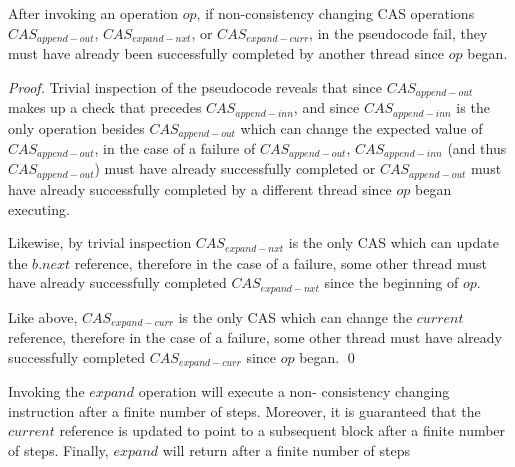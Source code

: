 \documentclass[runningheads,a4paper]{llncs}
\begin{document}

\begin{lemma}\label{lemma-non-consistency-cas} After invoking an operation
$op$, if non-consistency changing CAS operations $CAS_{append-out}$, 
$CAS_{expand-nxt}$, or $CAS_{expand-curr}$, in the pseudocode fail, they must have
already been successfully completed by another thread since $op$ began.
\end{lemma}

\begin{proof} Trivial inspection of the pseudocode reveals that since $CAS_{append-out}$ 
makes up a check that precedes $CAS_{append-inn}$, and since
$CAS_{append-inn}$ is the only operation besides $CAS_{append-out}$ which can
change the expected value of $CAS_{append-out}$, in the case of a failure of
$CAS_{append-out}$, $CAS_{append-inn}$ (and thus $CAS_{append-out}$) must have
already successfully completed or $CAS_{append-out}$ must have already
successfully completed by a different thread since $op$ began executing.

Likewise, by trivial inspection $CAS_{expand-nxt}$ is the only CAS which can
update the $b.next$ reference, therefore in the case of a failure, some other
thread must have already successfully completed $CAS_{expand-nxt}$ since the
beginning of $op$.

Like above, $CAS_{expand-curr}$ is the only CAS which can change the $current$
reference, therefore in the case of a failure, some other thread must have
already successfully completed $CAS_{expand-curr}$ since $op$ began. 
\qed
\end{proof}


\begin{lemma}[Expand]\label{lemma-expand}
Invoking the $expand$ operation will execute a non- consistency changing
instruction after a finite number of steps. Moreover, it is guaranteed that
the $current$ reference is updated to point to a subsequent block after a
finite number of steps. Finally, $expand$ will return after a finite number of
steps
\end{lemma}
\end{document}
